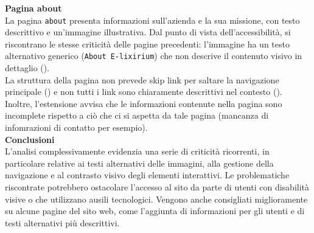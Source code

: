 \noindent \textbf{Pagina about}\\
La pagina \texttt{about} presenta informazioni sull’azienda e la sua missione, con testo descrittivo e un’immagine illustrativa. Dal punto di vista dell’accessibilità, si riscontrano le stesse criticità delle pagine precedenti: l’immagine ha un testo alternativo generico (\texttt{About E-lixirium}) che non descrive il contenuto visivo in dettaglio ({}).\\
La struttura della pagina non prevede skip link per saltare la navigazione principale ({}) e non tutti i link sono chiaramente descrittivi nel contesto ({}). Inoltre, l'estensione avvisa che le informazioni contenute nella pagina sono incomplete rispetto a ciò che ci si aspetta da tale pagina (mancanza di infomrazioni di contatto per esempio).\\

\noindent \textbf{Conclusioni}\\
L’analisi complessivamente evidenzia una serie di criticità ricorrenti, in particolare relative ai testi alternativi delle immagini, alla gestione della navigazione e al contrasto visivo degli elementi interattivi. Le problematiche riscontrate potrebbero ostacolare l’accesso al sito da parte di utenti con disabilità visive o che utilizzano ausili tecnologici. Vengono anche consigliati miglioramente su alcune pagine del sito web, come l'aggiunta di informazioni per gli utenti e di testi alternativi più descrittivi.

